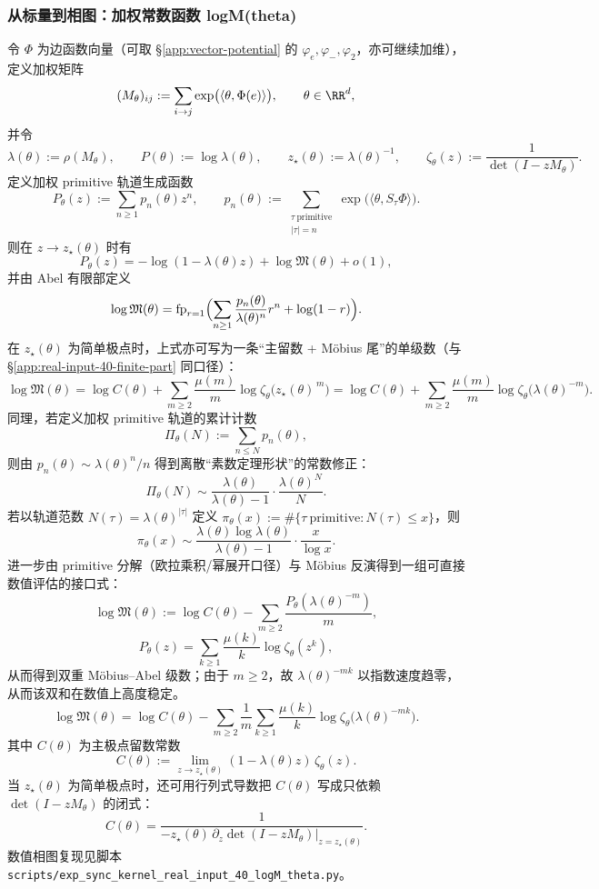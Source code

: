 \subsubsection{从标量到相图：加权常数函数 logM(theta)}\label{app:real-input-40-logm-theta}
令 $\Phi$ 为边函数向量（可取 \S\ref{app:vector-potential} 的 $\varphi_e,\varphi_-,\varphi_2$，亦可继续加维），
定义加权矩阵
\[
(M_\theta)_{ij}:=\sum_{i\to j}\exp\bigl(\langle\theta,\Phi(e)\rangle\bigr),\qquad \theta\in\RR^d,
\]
并令
\[
\lambda(\theta):=\rho(M_\theta),\qquad P(\theta):=\log\lambda(\theta),\qquad z_\star(\theta):=\lambda(\theta)^{-1},
\qquad
\zeta_\theta(z):=\frac{1}{\det(I-zM_\theta)}.
\]
定义加权 primitive 轨道生成函数
\[
P_\theta(z):=\sum_{n\ge 1}p_n(\theta)z^n,\qquad
p_n(\theta):=\sum_{\substack{\tau\ \mathrm{primitive}\\|\tau|=n}}\exp\bigl(\langle\theta,S_\tau\Phi\rangle\bigr).
\]
则在 $z\to z_\star(\theta)$ 时有
\[
P_\theta(z)=-\log(1-\lambda(\theta)z)+\log\mathfrak{M}(\theta)+o(1),
\]
并由 Abel 有限部定义
\[
\log\mathfrak{M}(\theta)=\mathrm{fp}_{r=1}\Bigl(\sum_{n\ge 1}\frac{p_n(\theta)}{\lambda(\theta)^n}r^n+\log(1-r)\Bigr).
\]
在 $z_\star(\theta)$ 为简单极点时，上式亦可写为一条“主留数 + Möbius 尾”的单级数（与 \S\ref{app:real-input-40-finite-part} 同口径）：
\[
\log\mathfrak{M}(\theta)
=\log C(\theta)+\sum_{m\ge 2}\frac{\mu(m)}{m}\log\zeta_\theta\bigl(z_\star(\theta)^{\,m}\bigr)
=\log C(\theta)+\sum_{m\ge 2}\frac{\mu(m)}{m}\log\zeta_\theta\bigl(\lambda(\theta)^{-m}\bigr).
\]
同理，若定义加权 primitive 轨道的累计计数
\[
\Pi_\theta(N):=\sum_{n\le N}p_n(\theta),
\]
则由 $p_n(\theta)\sim \lambda(\theta)^n/n$ 得到离散“素数定理形状”的常数修正：
\[
\Pi_\theta(N)\sim \frac{\lambda(\theta)}{\lambda(\theta)-1}\cdot\frac{\lambda(\theta)^N}{N}.
\]
若以轨道范数 $N(\tau)=\lambda(\theta)^{|\tau|}$ 定义 $\pi_\theta(x):=\#\{\tau\ \mathrm{primitive}:N(\tau)\le x\}$，则
\[
\pi_\theta(x)\sim \frac{\lambda(\theta)\log\lambda(\theta)}{\lambda(\theta)-1}\cdot\frac{x}{\log x}.
\]
进一步由 primitive 分解（欧拉乘积/幂展开口径）与 Möbius 反演得到一组可直接数值评估的接口式：
\[
\log\mathfrak{M}(\theta)
:=\log C(\theta)-\sum_{m\ge 2}\frac{P_\theta(\lambda(\theta)^{-m})}{m},
\]
\[
P_\theta(z)=\sum_{k\ge 1}\frac{\mu(k)}{k}\log\zeta_\theta(z^k),
\]
从而得到双重 Möbius--Abel 级数；由于 $m\ge 2$，故 $\lambda(\theta)^{-mk}$ 以指数速度趋零，从而该双和在数值上高度稳定。
\[
\log\mathfrak{M}(\theta)
=\log C(\theta)-\sum_{m\ge 2}\frac{1}{m}\sum_{k\ge 1}\frac{\mu(k)}{k}\log\zeta_\theta\bigl(\lambda(\theta)^{-mk}\bigr).
\]
其中 $C(\theta)$ 为主极点留数常数
\[
C(\theta):=\lim_{z\to z_\star(\theta)}(1-\lambda(\theta)z)\,\zeta_\theta(z).
\]
当 $z_\star(\theta)$ 为简单极点时，还可用行列式导数把 $C(\theta)$ 写成只依赖 $\det(I-zM_\theta)$ 的闭式：
\[
C(\theta)=\frac{1}{-z_\star(\theta)\,\partial_z\det(I-zM_\theta)\big|_{z=z_\star(\theta)}}.
\]
数值相图复现见脚本 \texttt{scripts/exp\_sync\_kernel\_real\_input\_40\_logM\_theta.py}。

